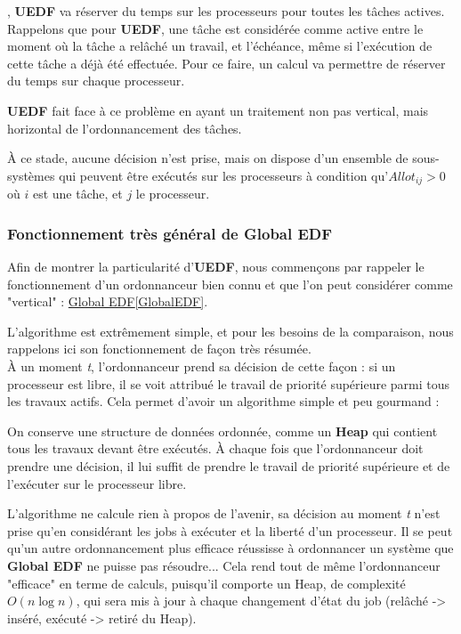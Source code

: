 	
	
	, \textbf{UEDF} va réserver du temps sur les processeurs pour toutes les tâches actives.
	Rappelons que pour \textbf{UEDF}, une tâche est considérée comme active entre le moment où la tâche 
	a relâché un travail, et l'échéance, même si l'exécution de cette tâche a déjà été effectuée.
	Pour ce faire, un calcul va permettre de réserver du temps sur chaque processeur.
	
	\textbf{UEDF} fait face à ce problème en ayant un traitement non pas vertical, mais horizontal
	de l'ordonnancement des tâches.	

	À ce stade, aucune décision n'est prise, mais on dispose d'un ensemble de sous-systèmes qui peuvent 
	être exécutés sur les processeurs à condition qu'$Allot_{ij} > 0$ où $i$ est une tâche, 
	et $j$ le processeur.
	

		\subsubsection{Fonctionnement très général de Global EDF}
		Afin de montrer la particularité d'\textbf{UEDF}, nous commençons par rappeler le fonctionnement 
		d'un ordonnanceur bien connu et que l'on peut considérer comme "vertical" : \hyperref[GlobalEDF]{Global EDF}\ref*{GlobalEDF}.
		
		L'algorithme est extrêmement simple, et pour les besoins de la comparaison, nous rappelons 
		ici son fonctionnement de façon très résumée.\\
		À un moment \textit{t}, l'ordonnanceur prend sa décision de cette façon :
		si un processeur est libre, il se voit attribué le travail de priorité supérieure parmi 
		tous les travaux actifs. Cela permet d'avoir un algorithme simple et peu gourmand :\newline
		
		On conserve une structure de données 
		ordonnée, comme un \textbf{Heap}  qui contient tous les travaux
		devant être exécutés. À chaque fois que l'ordonnanceur doit prendre 
		une décision, il lui suffit de prendre le travail de priorité supérieure et 
		de l'exécuter sur le processeur libre.
		
		L'algorithme ne calcule rien à propos de l'avenir, sa décision au moment \textit{t}
		n'est prise qu'en considérant les jobs à exécuter et la liberté d'un 
		processeur. Il se peut qu'un autre ordonnancement plus efficace 
		réussisse à ordonnancer un système que \textbf{Global EDF} ne puisse pas résoudre...
		Cela rend tout de même l'ordonnanceur "efficace" en terme de calculs, 
		puisqu'il comporte un Heap, de complexité $O(n\log n)$, qui sera mis à jour 
		à chaque changement d'état du job (relâché -> inséré, 
		exécuté -> retiré du Heap).
		
